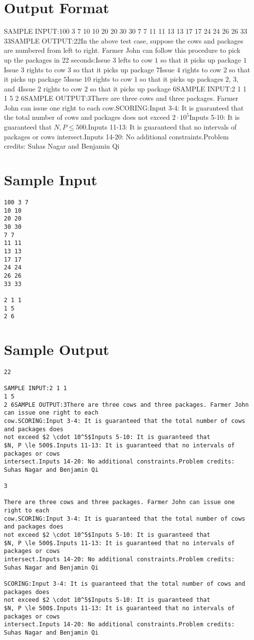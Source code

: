 \documentclass[12pt]{article}
\begin{document}
\section*{Output Format}
SAMPLE INPUT:100 3 7
10 10
20 20
30 30
7 7
11 11
13 13
17 17
24 24
26 26
33 33SAMPLE OUTPUT:22In the above test case, suppose the cows and packages are numbered from left to
right. Farmer John can follow this procedure to pick up the packages in 22
seconds:Issue $3$ lefts to cow $1$ so that it picks up package $1$Issue
$3$ rights to cow $3$ so that it picks up package $7$Issue $4$ rights
to cow $2$ so that it picks up package $5$Issue $10$ rights to cow $1$
so that it picks up packages $2$, $3$, and $4$Issue $2$ rights to cow
$2$ so that it picks up package $6$SAMPLE INPUT:2 1 1
1 5
2 6SAMPLE OUTPUT:3There are three cows and three packages. Farmer John can issue one right to each
cow.SCORING:Input 3-4: It is guaranteed that the total number of cows and packages does
not exceed $2 \cdot 10^5$Inputs 5-10: It is guaranteed that
$N, P \le 500$.Inputs 11-13: It is guaranteed that no intervals of packages or cows
intersect.Inputs 14-20: No additional constraints.Problem credits: Suhas Nagar and Benjamin Qi

\section*{Sample Input}
\begin{verbatim}
100 3 7
10 10
20 20
30 30
7 7
11 11
13 13
17 17
24 24
26 26
33 33

2 1 1
1 5
2 6
\end{verbatim}

\section*{Sample Output}
\begin{verbatim}
22

SAMPLE INPUT:2 1 1
1 5
2 6SAMPLE OUTPUT:3There are three cows and three packages. Farmer John can issue one right to each
cow.SCORING:Input 3-4: It is guaranteed that the total number of cows and packages does
not exceed $2 \cdot 10^5$Inputs 5-10: It is guaranteed that
$N, P \le 500$.Inputs 11-13: It is guaranteed that no intervals of packages or cows
intersect.Inputs 14-20: No additional constraints.Problem credits: Suhas Nagar and Benjamin Qi

3

There are three cows and three packages. Farmer John can issue one right to each
cow.SCORING:Input 3-4: It is guaranteed that the total number of cows and packages does
not exceed $2 \cdot 10^5$Inputs 5-10: It is guaranteed that
$N, P \le 500$.Inputs 11-13: It is guaranteed that no intervals of packages or cows
intersect.Inputs 14-20: No additional constraints.Problem credits: Suhas Nagar and Benjamin Qi

SCORING:Input 3-4: It is guaranteed that the total number of cows and packages does
not exceed $2 \cdot 10^5$Inputs 5-10: It is guaranteed that
$N, P \le 500$.Inputs 11-13: It is guaranteed that no intervals of packages or cows
intersect.Inputs 14-20: No additional constraints.Problem credits: Suhas Nagar and Benjamin Qi
\end{verbatim}
\end{document}
